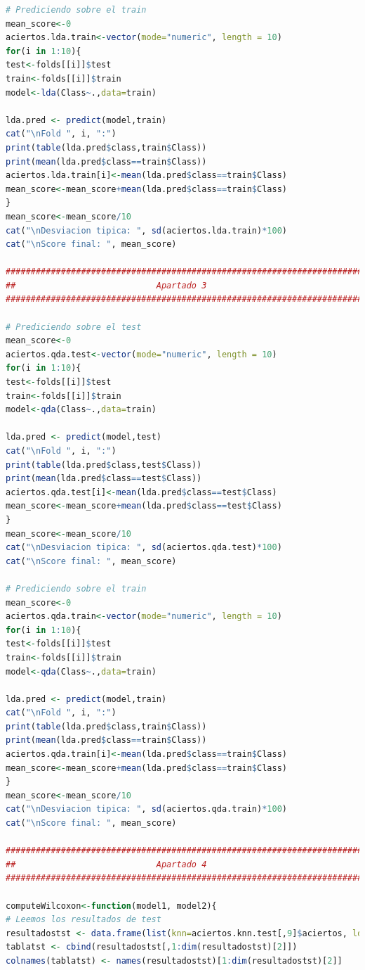 \documentclass[12pt,a4paper]{article}
\begin{document}
\begin{lstlisting}[basicstyle=\tiny, language=R]
# Prediciendo sobre el train
mean_score<-0
aciertos.lda.train<-vector(mode="numeric", length = 10)
for(i in 1:10){
test<-folds[[i]]$test
train<-folds[[i]]$train
model<-lda(Class~.,data=train)

lda.pred <- predict(model,train)
cat("\nFold ", i, ":")
print(table(lda.pred$class,train$Class))
print(mean(lda.pred$class==train$Class))
aciertos.lda.train[i]<-mean(lda.pred$class==train$Class)
mean_score<-mean_score+mean(lda.pred$class==train$Class)
}
mean_score<-mean_score/10
cat("\nDesviacion tipica: ", sd(aciertos.lda.train)*100)
cat("\nScore final: ", mean_score)

###########################################################################
##                            Apartado 3                                 ##
###########################################################################

# Prediciendo sobre el test
mean_score<-0
aciertos.qda.test<-vector(mode="numeric", length = 10)
for(i in 1:10){
test<-folds[[i]]$test
train<-folds[[i]]$train
model<-qda(Class~.,data=train)

lda.pred <- predict(model,test)
cat("\nFold ", i, ":")
print(table(lda.pred$class,test$Class))
print(mean(lda.pred$class==test$Class))
aciertos.qda.test[i]<-mean(lda.pred$class==test$Class)
mean_score<-mean_score+mean(lda.pred$class==test$Class)
}
mean_score<-mean_score/10
cat("\nDesviacion tipica: ", sd(aciertos.qda.test)*100)
cat("\nScore final: ", mean_score)

# Prediciendo sobre el train
mean_score<-0
aciertos.qda.train<-vector(mode="numeric", length = 10)
for(i in 1:10){
test<-folds[[i]]$test
train<-folds[[i]]$train
model<-qda(Class~.,data=train)

lda.pred <- predict(model,train)
cat("\nFold ", i, ":")
print(table(lda.pred$class,train$Class))
print(mean(lda.pred$class==train$Class))
aciertos.qda.train[i]<-mean(lda.pred$class==train$Class)
mean_score<-mean_score+mean(lda.pred$class==train$Class)
}
mean_score<-mean_score/10
cat("\nDesviacion tipica: ", sd(aciertos.qda.train)*100)
cat("\nScore final: ", mean_score)

###########################################################################
##                            Apartado 4                                 ##
###########################################################################

computeWilcoxon<-function(model1, model2){
# Leemos los resultados de test
resultadostst <- data.frame(list(knn=aciertos.knn.test[,9]$aciertos, lda=aciertos.lda.test, qda=aciertos.qda.test))
tablatst <- cbind(resultadostst[,1:dim(resultadostst)[2]])
colnames(tablatst) <- names(resultadostst)[1:dim(resultadostst)[2]]


\end{lstlisting}
\end{document}

